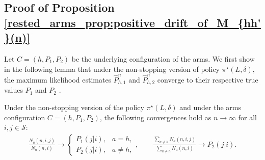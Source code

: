 \subsection{Proof of Proposition \ref{rested_arms_prop:positive_drift_of_M_{hh'}(n)}}\label{rested_arms_appndx:proof_of_strictly_positive_drift_of_M_{hh'}(n)}
Let $C=(h,P_1,P_2)$ be the underlying configuration of the arms. We first show in the following lemma that under the non-stopping version of policy $\pi^{\star}(L,\delta)$, the maximum likelihood estimates $\hat{P}^n_{h,1}$ and $\hat{P}^n_{h,2}$ converge to their respective true values $P_1$ and $P_2$ .
\begin{lemma}\label{rested_arms_lemma:convergence_of_ML_estimates}
	Under the non-stopping version of the policy $\pi^{\star}(L,\delta)$ and under the arms configuration $C=(h,P_1,P_2)$, the following convergences hold  as $n\to\infty$ for all $i,j\in\mathcal{S}$:
	\begingroup\allowdisplaybreaks\begin{align}
		\frac{N_a(n,i,j)}{N_a(n,i)}\longrightarrow\begin{cases}
			P_1(j|i),&a=h,\\
			P_2(j|i),&a\neq h,
		\end{cases},\qquad
		\frac{\sum\limits_{a\neq h}N_a(n,i,j)}{\sum\limits_{a\neq h}N_a(n,i)}\longrightarrow P_2(j|i).\label{rested_arms_eq:convergence_of_ml_estimates}
	\end{align}\endgroup
\end{lemma}

